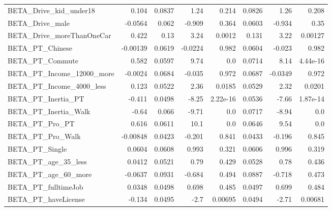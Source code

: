 \begin{tabular}{lrrrrrrr}
BETA\_Drive\_kid\_under18       &    0.104 &   0.0837 &     1.24 &    0.214 &        0.0826 &         1.26 &         0.208 \\
BETA\_Drive\_male              &  -0.0564 &    0.062 &   -0.909 &    0.364 &        0.0603 &       -0.934 &          0.35 \\
BETA\_Drive\_moreThanOneCar    &    0.422 &     0.13 &     3.24 &   0.0012 &         0.131 &         3.22 &       0.00127 \\
BETA\_PT\_Chinese              & -0.00139 &   0.0619 &  -0.0224 &    0.982 &        0.0604 &       -0.023 &         0.982 \\
BETA\_PT\_Commute              &    0.582 &   0.0597 &     9.74 &      0.0 &        0.0714 &         8.14 &      4.44e-16 \\
BETA\_PT\_Income\_12000\_more    &  -0.0024 &   0.0684 &   -0.035 &    0.972 &        0.0687 &      -0.0349 &         0.972 \\
BETA\_PT\_Income\_4000\_less     &    0.123 &   0.0522 &     2.36 &   0.0185 &        0.0529 &         2.32 &        0.0201 \\
BETA\_PT\_Inertia\_PT           &   -0.411 &   0.0498 &    -8.25 & 2.22e-16 &        0.0536 &        -7.66 &      1.87e-14 \\
BETA\_PT\_Inertia\_Walk         &    -0.64 &    0.066 &    -9.71 &      0.0 &        0.0717 &        -8.94 &           0.0 \\
BETA\_PT\_Pro\_PT               &    0.616 &   0.0611 &     10.1 &      0.0 &        0.0646 &         9.54 &           0.0 \\
BETA\_PT\_Pro\_Walk             & -0.00848 &   0.0423 &   -0.201 &    0.841 &        0.0433 &       -0.196 &         0.845 \\
BETA\_PT\_Single               &   0.0604 &   0.0608 &    0.993 &    0.321 &        0.0606 &        0.996 &         0.319 \\
BETA\_PT\_age\_35\_less          &   0.0412 &   0.0521 &     0.79 &    0.429 &        0.0528 &         0.78 &         0.436 \\
BETA\_PT\_age\_60\_more          &  -0.0637 &   0.0931 &   -0.684 &    0.494 &        0.0887 &       -0.718 &         0.473 \\
BETA\_PT\_fulltimeJob          &   0.0348 &   0.0498 &    0.698 &    0.485 &        0.0497 &        0.699 &         0.484 \\
BETA\_PT\_haveLicense          &   -0.134 &   0.0495 &     -2.7 &  0.00695 &        0.0494 &        -2.71 &       0.00681 \\

\end{tabular}
